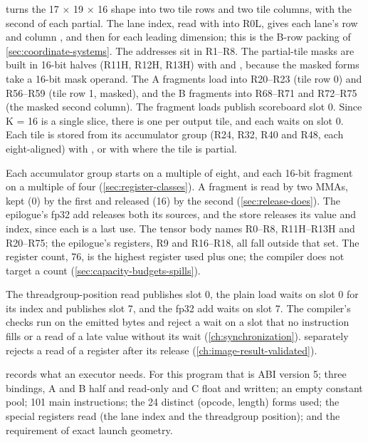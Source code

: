  turns the 17 × 19 × 16 shape into two tile rows and two tile columns, with the second of
each partial. The lane index, read with  into R0L, gives each lane's row  and column , and then  for each leading dimension; this is
the B-row packing of \cref{sec:coordinate-systems}. The addresses sit in R1–R8. The partial-tile masks are built in
16-bit halves (R11H, R12H, R13H) with  and , because the masked forms take a 16-bit mask operand.
The A fragments load into R20–R23 (tile row 0) and R56–R59 (tile row 1, masked), and the B fragments into R68–R71 and
R72–R75 (the masked second column). The fragment loads publish scoreboard slot 0. Since K = 16 is a single slice, there is
one  per output tile, and each waits on slot 0. Each tile is stored from its accumulator group (R24, R32, R40
and R48, each eight-aligned) with , or with  where the tile is partial.

Each accumulator group starts on a multiple of eight, and each 16-bit fragment on a multiple of four
(\cref{sec:register-classes}). A fragment is read by two MMAs, kept (0) by the first and released (16) by the
second (\cref{sec:release-does}). The epilogue's fp32 add releases both its sources, and the store releases its value
and index, since each is a last use. The tensor body names R0–R8, R11H–R13H and R20–R75; the epilogue's registers, R9
and R16–R18, all fall outside that set. The register count, 76, is the highest register used plus one; the compiler
does not target a count (\cref{sec:capacity-budgets-spills}).

The threadgroup-position read publishes slot 0, the plain load waits on slot 0 for its index and publishes slot 7, and
the fp32 add waits on slot 7. The compiler's checks run on the emitted bytes and reject a wait on a slot that no instruction fills or a read of a late value without its wait
(\cref{ch:synchronization}).  separately rejects a read of a register after its
release (\cref{ch:image-result-validated}).

 records what an executor needs. For this program that is ABI version 5; three bindings, A and B
half and read-only and C float and written; an empty constant pool; 101 main instructions; the 24 distinct (opcode,
length) forms used; the special registers read (the lane index and the threadgroup position); and the requirement of
exact launch geometry.

